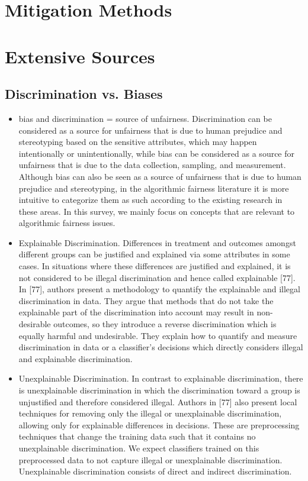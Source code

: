 \documentclass[12pt, a4paper, oneside]{book}   	%
\newif\ifrawcitationactive
\newcommand{\rawcitationstart}{
	\color{purple}\rawcitationactivetrue
}
\begin{document}
			
		\section{Mitigation Methods}
			
			
			
		\section{Extensive Sources}
			
			\rawcitationstart
			\subsection{Discrimination vs. Biases}
			\begin{itemize}
				\item bias and discrimination = source of unfairness. Discrimination can be considered as a source for unfairness that is due to human prejudice and stereotyping based on the sensitive attributes, which may happen intentionally or unintentionally, while bias can be considered as a source for unfairness that is due to the data collection, sampling, and measurement. Although bias can also be seen as a source of unfairness that is due to human prejudice and stereotyping, in the algorithmic fairness literature it is more intuitive to categorize them as such according to the existing research in these areas. In this survey, we mainly focus on concepts that are relevant to algorithmic fairness issues. \autocite{Mehrabi_2021}
				\item Explainable Discrimination. Differences in treatment and outcomes amongst different groups can be justified and explained via some attributes in some cases. In situations where these differences are justified and explained, it is not considered to be illegal discrimination and hence called explainable [77]. In [77], authors present a methodology to quantify the explainable and illegal discrimination in data. They argue that methods that do not take the explainable part of the discrimination into account may result in non-desirable outcomes, so they introduce a reverse discrimination which is equally harmful and undesirable. They explain how to quantify and measure discrimination in data or a classifier’s decisions which directly considers illegal and explainable discrimination.\autocite{Mehrabi_2021}
				\item Unexplainable Discrimination. In contrast to explainable discrimination, there is unexplainable discrimination in which the discrimination toward a group is unjustified and therefore considered illegal. Authors in [77] also present local techniques for removing only the illegal or unexplainable discrimination, allowing only for explainable differences in decisions. These are preprocessing techniques that change the training data such that it contains no unexplainable discrimination. We expect classifiers trained on this preprocessed data to not capture illegal or unexplainable discrimination. Unexplainable discrimination consists of direct and indirect discrimination.\autocite{Mehrabi_2021}

\end{itemize}
\end{document}
